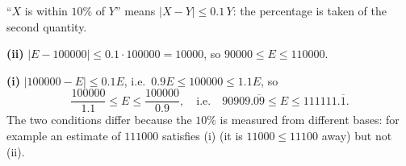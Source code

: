 ``$X$ is within $10\%$ of $Y$'' means $|X-Y|\le0.1\,Y$: the percentage is taken of the second quantity.

\textbf{(ii)} $|E-100000|\le0.1\cdot100000=10000$, so $\boxed{90000\le E\le110000}$.

\textbf{(i)} $|100000-E|\le0.1E$, i.e.\ $0.9E\le100000\le1.1E$, so
\[
\boxed{\dfrac{100000}{1.1}\le E\le\dfrac{100000}{0.9}},\quad\text{i.e.}\quad 90909.\overline{09}\le E\le111111.\overline{1}.
\]
The two conditions differ because the $10\%$ is measured from different bases: for example an estimate of $111000$ satisfies (i) (it is $11000\le11100$ away) but not (ii).
